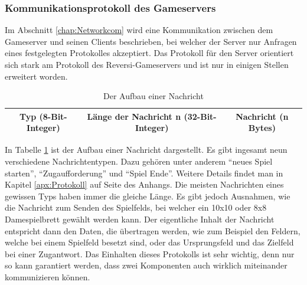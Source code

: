 \documentclass[12pt,a4paper,bibliography=totocnumbered,listof=totocnumbered]{article}
\begin{document}
\subsubsection{Kommunikationsprotokoll des Gameservers}
Im Abschnitt \ref{chap:Networkcom} wird eine Kommunikation zwischen dem Gameserver und seinen Clients beschrieben, bei welcher der 
Server nur Anfragen eines festgelegten Protokolles akzeptiert. Das Protokoll für den Server orientiert sich stark am Protokoll
des Reversi-Gameservers und ist nur in einigen Stellen erweitert worden.

\begin{table}[H]
    \centering
    \begin{tabular} {|c|c|c|}
        \hline
        Typ (8-Bit-Integer) & Länge der Nachricht n (32-Bit-Integer) & Nachricht (n Bytes) \\
        \hline
    \end{tabular}
	\caption{Der Aufbau einer Nachricht}
    \label{tab:Nachritenaufbau}
\end{table}

In Tabelle \ref{tab:Nachritenaufbau} ist der Aufbau einer Nachricht dargestellt. Es gibt ingesamt neun verschiedene Nachrichtentypen. Dazu gehören unter anderem
``neues Spiel starten'', ``Zugaufforderung'' und ``Spiel Ende''. Weitere Details findet man in Kapitel \ref{apx:Protokoll} auf Seite \pageref{apx:Protokoll} des Anhangs. 
Die meisten Nachrichten eines gewissen Typs haben immer die gleiche Länge. Es gibt jedoch
Ausnahmen, wie die Nachricht zum Senden des Spielfelds, bei welcher ein 10x10 oder 8x8 Damespielbrett gewählt werden kann. Der eigentliche Inhalt der Nachricht entspricht dann 
den Daten, die übertragen werden, wie zum Beispiel den Feldern, welche bei einem Spielfeld besetzt sind, oder das Ursprungsfeld und das Zielfeld bei einer Zugantwort. 
Das Einhalten dieses Protokolls ist sehr wichtig, denn nur so kann garantiert werden, dass zwei Komponenten auch wirklich miteinander kommunizieren können.
\end{document}

